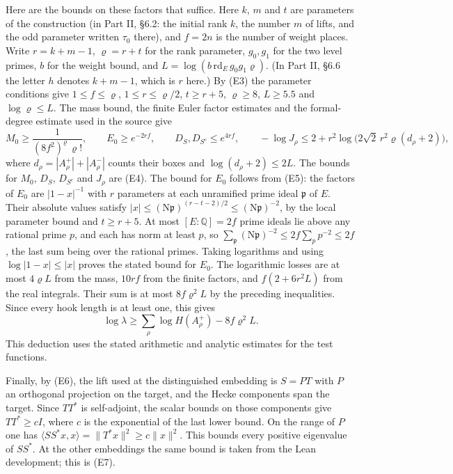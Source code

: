 \documentclass[11pt,letterpaper]{article}
\begin{document}
Here are the bounds on these factors that suffice. Here $k$, $m$ and $t$ are parameters of the construction
(in Part II, \S6.2: the initial rank $k$, the number $m$ of lifts, and the odd parameter written $\tau_0$
there), and $f=2n$ is the number of weight places. Write $r=k+m-1$,
$\varrho=r+t$ for the rank parameter, $g_0,g_1$ for the two level primes,
$b$ for the weight bound, and
$L=\log(b\,\mathrm{rd}_E\,g_0g_1\varrho)$. (In Part II, \S6.6 the letter $h$ denotes $k+m-1$, which is $r$ here.)
By (E3) the parameter conditions give
$1\le f\le\varrho$, $1\le r\le\varrho/2$, $t\ge r+5$, $\varrho\ge8$, $L\ge5.5$ and $\log\varrho\le L$.
The mass bound, the finite Euler factor estimates and the
formal-degree estimate used in the source give
\begin{equation}\label{III:massbd}
 M_0\ge\frac1{(8 f^2)^\varrho\,\varrho!},\qquad E_0\ge e^{-2rf},
 \qquad D_S,D_{S^c}\le e^{4rf},\qquad
 -\log J_\rho\le2+r^2\log\bigl(2\sqrt2\,r^2\varrho(d_\rho+2)\bigr),
\end{equation}
where $d_\rho=|A_\rho^+|+|A_\rho^-|$ counts their boxes and $\log(d_\rho+2)\le2L$. The bounds for $M_0$,
$D_S$, $D_{S^c}$ and $J_\rho$ are (E4). The bound for $E_0$ follows from (E5):
the factors of $E_0$ are $|1-x|^{-1}$ with $r$ parameters
at each unramified prime ideal $\mathfrak p$ of $E$. Their absolute
values satisfy $|x|\le(\mathrm N\mathfrak p)^{(r-t-2)/2}
\le(\mathrm N\mathfrak p)^{-2}$, by the local parameter bound and
$t\ge r+5$. At most $[E:\mathbb Q]=2f$ prime ideals lie above any
rational prime $p$, and each has norm at least $p$, so $\sum_{\mathfrak p}(\mathrm N\mathfrak p)^{-2}
\le2f\sum_{p}p^{-2}\le2f$, the last sum being over the rational primes. Taking logarithms and using
$\log|1-x|\le|x|$ proves the stated bound for $E_0$.
The logarithmic losses are at most $4\varrho L$ from the mass, $10rf$ from
the finite factors, and $f(2+6r^2L)$ from the real integrals.
Their sum is at most $8f\varrho^2L$ by the preceding inequalities.
Since every hook length is at least one, this gives
\begin{equation}\label{D:174}
             \log\lambda\ge
             \sum_\rho\log H(A_\rho^+)-8f\varrho^2L .
\end{equation}
This deduction uses the stated arithmetic and analytic estimates for
the test functions.

Finally, by (E6), the lift used at the distinguished embedding is $S=PT$ with
$P$ an orthogonal projection on the target, and the Hecke components span
the target. Since $TT^*$ is self-adjoint, the scalar bounds on those
components give $TT^*\ge cI$, where $c$ is the exponential of the
last lower bound. On the range of $P$ one has
$\langle SS^*x,x\rangle=\|T^*x\|^2\ge c\|x\|^2$. This bounds every
positive eigenvalue of $SS^*$. At the other embeddings the same bound is taken from the Lean development;
this is (E7).
\end{document}
